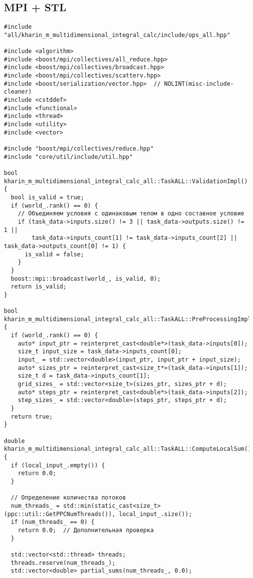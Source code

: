 \documentclass[12pt]{article}
\begin{document}
\subsection*{MPI + STL}
\begin{lstlisting}
#include "all/kharin_m_multidimensional_integral_calc/include/ops_all.hpp"

#include <algorithm>
#include <boost/mpi/collectives/all_reduce.hpp>
#include <boost/mpi/collectives/broadcast.hpp>
#include <boost/mpi/collectives/scatterv.hpp>
#include <boost/serialization/vector.hpp>  // NOLINT(misc-include-cleaner)
#include <cstddef>
#include <functional>
#include <thread>
#include <utility>
#include <vector>

#include "boost/mpi/collectives/reduce.hpp"
#include "core/util/include/util.hpp"

bool kharin_m_multidimensional_integral_calc_all::TaskALL::ValidationImpl() {
  bool is_valid = true;
  if (world_.rank() == 0) {
    // Объединяем условия с одинаковым телом в одно составное условие
    if (task_data->inputs.size() != 3 || task_data->outputs.size() != 1 ||
        task_data->inputs_count[1] != task_data->inputs_count[2] || task_data->outputs_count[0] != 1) {
      is_valid = false;
    }
  }
  boost::mpi::broadcast(world_, is_valid, 0);
  return is_valid;
}

bool kharin_m_multidimensional_integral_calc_all::TaskALL::PreProcessingImpl() {
  if (world_.rank() == 0) {
    auto* input_ptr = reinterpret_cast<double*>(task_data->inputs[0]);
    size_t input_size = task_data->inputs_count[0];
    input_ = std::vector<double>(input_ptr, input_ptr + input_size);
    auto* sizes_ptr = reinterpret_cast<size_t*>(task_data->inputs[1]);
    size_t d = task_data->inputs_count[1];
    grid_sizes_ = std::vector<size_t>(sizes_ptr, sizes_ptr + d);
    auto* steps_ptr = reinterpret_cast<double*>(task_data->inputs[2]);
    step_sizes_ = std::vector<double>(steps_ptr, steps_ptr + d);
  }
  return true;
}

double kharin_m_multidimensional_integral_calc_all::TaskALL::ComputeLocalSum() {
  if (local_input_.empty()) {
    return 0.0;
  }

  // Определение количества потоков
  num_threads_ = std::min(static_cast<size_t>(ppc::util::GetPPCNumThreads()), local_input_.size());
  if (num_threads_ == 0) {
    return 0.0;  // Дополнительная проверка
  }

  std::vector<std::thread> threads;
  threads.reserve(num_threads_);
  std::vector<double> partial_sums(num_threads_, 0.0);


\end{lstlisting}
\end{document}
